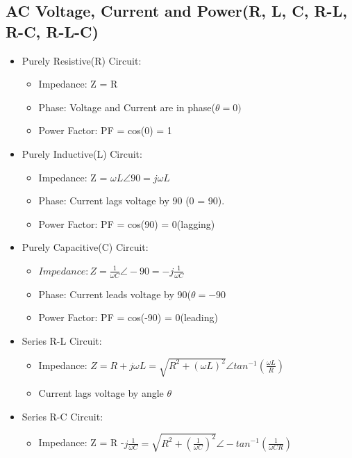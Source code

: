 \documentclass{article}
\begin{document}
\begin{enumerate}
\section{AC Voltage, Current and Power(R, L, C, R-L, R-C, R-L-C)}
\begin{itemize}
    \item Purely Resistive(R) Circuit:
    \begin{itemize}
        \item Impedance: Z = R
        \item Phase: Voltage and Current are in phase($\theta = 0)$
        \item Power Factor: PF = cos(0) = 1
    \end{itemize}
    \item Purely Inductive(L) Circuit:
    \begin{itemize}
        \item Impedance: Z = $ \omega L\angle 90 = j\omega L $
        \item Phase: Current lags voltage by 90 (0 = 90).
        \item Power Factor: PF = cos(90) = 0(lagging)
    \end{itemize}
    \item Purely Capacitive(C) Circuit:
    \begin{itemize}
        \item $Impedance: Z = \frac{1}{\omega C}\angle -90 = -j\frac{1}{\omega C}$
        \item Phase: Current leads voltage by 90($\theta = -90$
        \item Power Factor: PF = cos(-90) = 0(leading)
    \end{itemize}
    \item Series R-L Circuit:
    \begin{itemize}
        \item Impedance: $ Z = R + j\omega L = \sqrt{R^2 + (\omega L)^2}\angle tan^{-1}(\frac{\omega L}{R})$
        \item Current lags voltage by angle $\theta$
    \end{itemize}
    \item Series R-C Circuit:
    \begin{itemize}
        \item Impedance: Z = R -$ j\frac{1}{\omega C} = \sqrt{R^2 +(\frac{1}{\omega C})^2}\angle -tan^{-1}(\frac{1}{\omega CR})$
    \end{itemize}
    
\end{itemize}

\end{enumerate}
\end{document}
